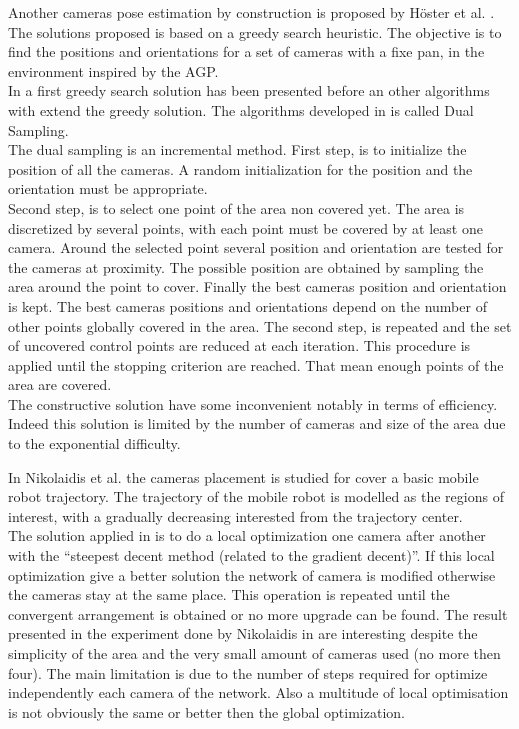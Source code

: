 Another cameras pose estimation by construction is proposed by Höster et al. \cite{171*horster2006}.
The solutions proposed is based on a greedy search heuristic. The objective is to find the positions and orientations for a set of cameras with a fixe pan, in the environment inspired by the AGP. \\
In \cite{171*horster2006} a first greedy search solution has been presented before an other algorithms with extend the greedy solution. The algorithms developed in \cite{171*horster2006} is called Dual Sampling.\\
The dual sampling is an incremental method. 
First step, is to initialize the position of all the cameras. A random initialization for the position and the orientation must be appropriate.  \\
Second step, is to select one point of the area non covered yet. The area is discretized by several points, with each point must be covered by at least one camera. Around the selected point several position and orientation are tested for the cameras at proximity. The possible position are obtained by sampling the area around the point to cover. Finally the best cameras position and orientation is kept. The best cameras positions and orientations depend on the number of other points globally covered in the area. 
The second step, is repeated and the set of uncovered control points are reduced at each iteration. This procedure is applied until the stopping criterion are reached. That mean enough points of the area are covered. \\
The constructive solution have some inconvenient notably in terms of efficiency. Indeed this solution is limited by the number of cameras and size of the area due to the exponential difficulty. %

In Nikolaidis et al. \cite{81*nikolaidis2009} the cameras placement is studied for cover a basic mobile robot trajectory.
The trajectory of the mobile robot is modelled as the regions of interest, with a gradually decreasing interested from the trajectory center.\\
  The solution applied in \cite{81*nikolaidis2009} is to do a local optimization one camera after another with the “steepest decent method (related to  the gradient decent)”. If this local optimization give a better solution the network of camera is modified otherwise the cameras stay at the same place. This operation is repeated until the convergent arrangement is obtained or no more upgrade can be found. The result presented in the experiment done by Nikolaidis in  \cite{81*nikolaidis2009} are interesting despite the simplicity of the area and the very small amount of cameras used (no more then four). The main limitation is due to the number of steps required for optimize independently each camera of the network. Also a multitude of local optimisation is not obviously the same or better then the global optimization.

